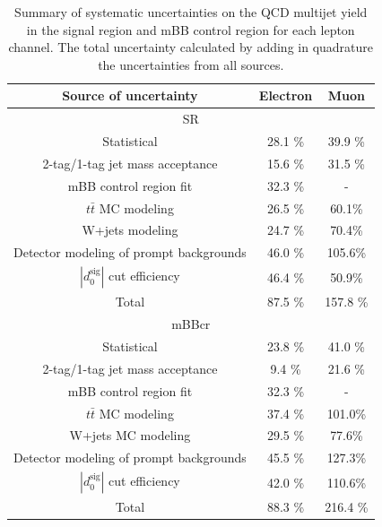 \begin{table}[!htbp]
\begin{center}
\begin{tabular}{c|c|c}
Source of uncertainty &  Electron  & Muon  \\  
\hline
\multicolumn{3}{c}{SR} \\
\hline
Statistical                                      &  28.1 \% & 39.9 \% \\
2-tag/1-tag jet mass acceptance                  &  15.6 \% & 31.5 \% \\
mBB control region fit                           &  32.3 \% & - \\
$t\bar{t}$ MC modeling                          &  26.5 \% & 60.1\% \\
W+jets modeling                                 &  24.7 \% & 70.4\% \\
Detector modeling of prompt backgrounds         &  46.0 \% & 105.6\% \\
$|d_{0}^{\textrm{sig}}|$ cut efficiency          &  46.4 \% & 50.9\% \\
\hline
Total                                            &  87.5 \% & 157.8 \% \\
\hline
\hline
\multicolumn{3}{c}{mBBcr} \\
\hline
Statistical                                      &  23.8 \% & 41.0 \% \\
2-tag/1-tag jet mass acceptance                  &  9.4  \% & 21.6 \% \\
mBB control region fit                           &  32.3 \% & -       \\
$t\bar{t}$ MC modeling                          &  37.4 \% & 101.0\% \\
W+jets MC modeling                              &  29.5 \% & 77.6\% \\
Detector modeling of prompt backgrounds         &  45.5 \% & 127.3\% \\
$|d_{0}^{\textrm{sig}}|$ cut efficiency          &  42.0 \% & 110.6\% \\
\hline
Total                                            &  88.3 \% & 216.4 \% \\
\end{tabular}
\end{center}
\caption{Summary of systematic uncertainties on the QCD multijet yield in the signal region and mBB control region
for each lepton channel. The total uncertainty calculated by adding in quadrature the uncertainties from all sources.}
\label{tab:boosted_syst_qcd_norm_unc_final}
\end{table}
 
